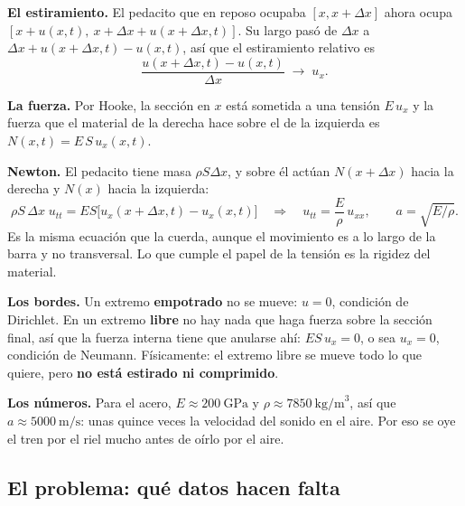 \documentclass[
  spanish,
  a4paper,
]{scrbook}
\theoremstyle{definition}
\theoremstyle{plain}
\theoremstyle{definition}
\theoremstyle{plain}
\theoremstyle{definition}
\theoremstyle{remark}
\begin{document}
\begin{tcolorbox}[enhanced jigsaw, arc=.35mm, bottomrule=.15mm, bottomtitle=1mm, breakable, colback=white, colbacktitle=quarto-callout-tip-color!10!white, colframe=quarto-callout-tip-color-frame, coltitle=black, left=2mm, leftrule=.75mm, opacityback=0, opacitybacktitle=0.6, rightrule=.15mm, title=\textcolor{quarto-callout-tip-color}{\faLightbulb}\hspace{0.5em}{Solución}, titlerule=0mm, toprule=.15mm, toptitle=1mm]

\textbf{El estiramiento.} El pedacito que en reposo ocupaba
\([x, x+\Delta x]\) ahora ocupa
\([x+u(x,t),\ x+\Delta x + u(x+\Delta x,t)]\). Su largo pasó de
\(\Delta x\) a \(\Delta x + u(x+\Delta x,t) - u(x,t)\), así que el
estiramiento relativo es
\[\frac{u(x+\Delta x,t)-u(x,t)}{\Delta x} \;\longrightarrow\; u_x .\]

\textbf{La fuerza.} Por Hooke, la sección en \(x\) está sometida a una
tensión \(E\,u_x\) y la fuerza que el material de la derecha hace sobre
el de la izquierda es \(N(x,t) = E\,S\,u_x(x,t)\).

\textbf{Newton.} El pedacito tiene masa \(\rho S\Delta x\), y sobre él
actúan \(N(x+\Delta x)\) hacia la derecha y \(N(x)\) hacia la izquierda:
\[\rho S\,\Delta x\;u_{tt} = E S\big[u_x(x+\Delta x,t) - u_x(x,t)\big]
\quad\Longrightarrow\quad u_{tt} = \frac{E}{\rho}\,u_{xx}, \qquad a = \sqrt{E/\rho}.\]
Es la misma ecuación que la cuerda, aunque el movimiento es a lo largo
de la barra y no transversal. Lo que cumple el papel de la tensión es la
rigidez del material.

\textbf{Los bordes.} Un extremo \textbf{empotrado} no se mueve:
\(u = 0\), condición de Dirichlet. En un extremo \textbf{libre} no hay
nada que haga fuerza sobre la sección final, así que la fuerza interna
tiene que anularse ahí: \(E S\,u_x = 0\), o sea \(u_x = 0\), condición
de Neumann. Físicamente: el extremo libre se mueve todo lo que quiere,
pero \textbf{no está estirado ni comprimido}.

\textbf{Los números.} Para el acero, \(E \approx 200\ \text{GPa}\) y
\(\rho\approx 7850\ \text{kg/m}^3\), así que
\(a\approx 5000\ \text{m/s}\): unas quince veces la velocidad del sonido
en el aire. Por eso se oye el tren por el riel mucho antes de oírlo por
el aire.

\end{tcolorbox}

\subsection{El problema: qué datos hacen falta}\label{sec-hip-planteo}
\end{document}
